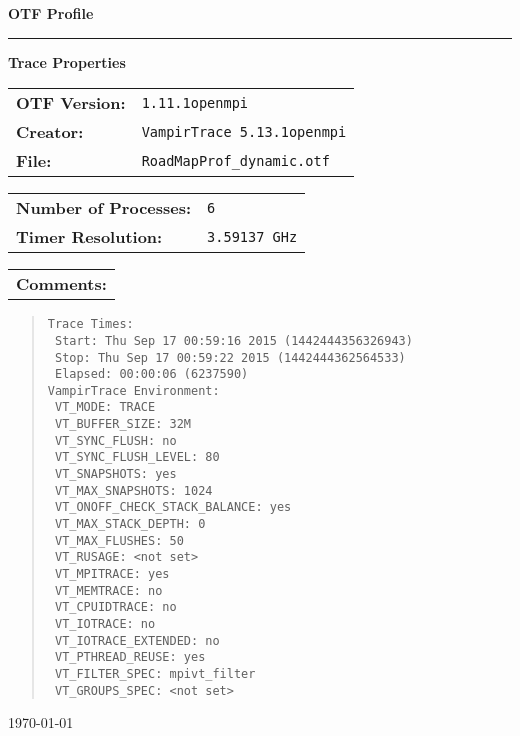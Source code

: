 \documentclass[a4paper,10pt]{article}
\begin{document}
\begin{titlepage}\thispagestyle{empty}
\begin{huge}\begin{flushleft}\bf{OTF Profile}\end{flushleft}\end{huge}
\hrule
\begin{flushright}\textbf{\large Trace Properties}\end{flushright}
\vspace{0.5\baselineskip}
\begin{flushleft}
\begin{tabular}{ll}
\bf{OTF Version:} & \verb|1.11.1openmpi| \\
\bf{Creator:} & \verb|VampirTrace 5.13.1openmpi|\\
\bf{File:} & \verb|RoadMapProf_dynamic.otf|
\end{tabular}

\vspace{1\baselineskip}
\begin{tabular}{ll}
\bf{Number of Processes:} & \verb|6|\\
\bf{Timer Resolution:} & \verb|3.59137 GHz|
\end{tabular}

\vspace{1\baselineskip}
\begin{tabular}{l}\bf{Comments:}\end{tabular}
\begin{quote}\begin{verbatim}
Trace Times:
 Start: Thu Sep 17 00:59:16 2015 (1442444356326943)
 Stop: Thu Sep 17 00:59:22 2015 (1442444362564533)
 Elapsed: 00:00:06 (6237590)
VampirTrace Environment:
 VT_MODE: TRACE
 VT_BUFFER_SIZE: 32M
 VT_SYNC_FLUSH: no
 VT_SYNC_FLUSH_LEVEL: 80
 VT_SNAPSHOTS: yes
 VT_MAX_SNAPSHOTS: 1024
 VT_ONOFF_CHECK_STACK_BALANCE: yes
 VT_MAX_STACK_DEPTH: 0
 VT_MAX_FLUSHES: 50
 VT_RUSAGE: <not set>
 VT_MPITRACE: yes
 VT_MEMTRACE: no
 VT_CPUIDTRACE: no
 VT_IOTRACE: no
 VT_IOTRACE_EXTENDED: no
 VT_PTHREAD_REUSE: yes
 VT_FILTER_SPEC: mpivt_filter
 VT_GROUPS_SPEC: <not set>
\end{verbatim}\end{quote}
\end{flushleft}
\vspace*{\fill}
\begin{flushright}\today\end{flushright}
\end{titlepage}
\end{document}
